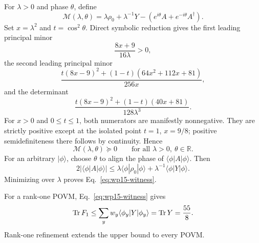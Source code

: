 For $\lambda>0$ and phase $\theta$, define
\begin{equation}
\mathcal M(\lambda,\theta)
=
\lambda\rho_0+\lambda^{-1}Y
-\left(e^{i\theta}A+e^{-i\theta}A^\dagger\right).
\label{eq:wp15-LMI}
\end{equation}
Set $x=\lambda^2$ and $t=\cos^2\theta$. Direct symbolic reduction gives the first leading principal minor
\begin{equation}
\frac{8x+9}{16\lambda}>0,
\end{equation}
the second leading principal minor
\begin{equation}
\frac{
 t(8x-9)^2+(1-t)(64x^2+112x+81)
}{256x},
\label{eq:wp15-minor2}
\end{equation}
and the determinant
\begin{equation}
\frac{
 t(8x-9)^2+(1-t)(40x+81)
}{128\lambda^3}.
\label{eq:wp15-det}
\end{equation}
For $x>0$ and $0\le t\le1$, both numerators are manifestly nonnegative. They are strictly positive except at the isolated point $t=1$, $x=9/8$; positive semidefiniteness there follows by continuity. Hence
\begin{equation}
\mathcal M(\lambda,\theta)\succeq0
\qquad\text{for all }\lambda>0,\ \theta\in\mathbb R.
\end{equation}
For an arbitrary $|\phi\rangle$, choose $\theta$ to align the phase of $\langle\phi|A|\phi\rangle$. Then
\begin{equation}
2|\langle\phi|A|\phi\rangle|
\le
\lambda\langle\phi|\rho_0|\phi\rangle
+\lambda^{-1}\langle\phi|Y|\phi\rangle.
\end{equation}
Minimizing over $\lambda$ proves Eq.~\eqref{eq:wp15-witness}.

For a rank-one POVM, Eq.~\eqref{eq:wp15-witness} gives
\begin{equation}
\operatorname{Tr} F_1
\le
\sum_y w_y\langle\phi_y|Y|\phi_y\rangle
=\operatorname{Tr} Y
=\frac{55}{8}.
\label{eq:wp15-upper}
\end{equation}
Rank-one refinement extends the upper bound to every POVM.

